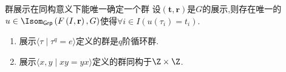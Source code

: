 \begin{proposition}{群展示在同构意义下能唯一确定一个群}{}
	设$\left(\mathbf{t},\mathbf{r}\right)$是$G$的展示,则存在唯一的$u\in\Isom_{\mathsf{Grp}}\left(F\left(I,\mathbf{r}\right),G\right)$使得$\forall i\in I\left(u\left(\tau_{i}\right)=t_{i}\right)$.
\end{proposition}

\begin{example}{}{}
	\begin{enumerate}
		\item 展示$\langle\tau\mid\tau^{q}=e\rangle$定义的群是$q$阶循环群.
		\item 展示$\langle x,y\mid xy=yx\rangle$定义的群同构于$\Z\times\Z$.
	\end{enumerate}
\end{example}

